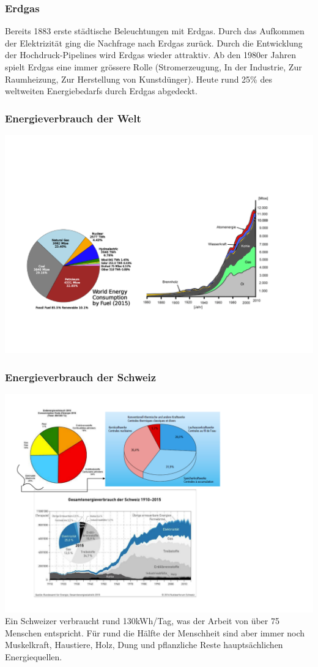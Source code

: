 \documentclass[10pt, openright=true]{scrartcl}
\begin{document}
\subsubsection{Erdgas}
Bereits 1883 erste städtische Beleuchtungen mit Erdgas. Durch das Aufkommen der Elektrizität ging die Nachfrage nach Erdgas zurück. Durch die Entwicklung der Hochdruck-Pipelines wird Erdgas wieder attraktiv. Ab den 1980er Jahren spielt Erdgas eine immer grössere Rolle (Stromerzeugung, In der Industrie, Zur Raumheizung, Zur Herstellung von Kunstdünger). Heute rund 25\% des weltweiten Energiebedarfs durch Erdgas abgedeckt.
\subsubsection{Energieverbrauch der Welt}\vspace{-1.5cm}
\includegraphics[width=.8\textwidth]{images/energiewelt} \vspace{-.5cm}
\subsubsection{Energieverbrauch der Schweiz}
\includegraphics[width=.9\textwidth]{images/energieschweiz} \\
Ein Schweizer verbraucht rund 130kWh/Tag, was der Arbeit von über 75 Menschen entspricht. Für rund die Hälfte der Menschheit sind aber immer noch Muskelkraft, Haustiere, Holz, Dung und pflanzliche Reste hauptsächlichen Energiequellen.
\end{document}

